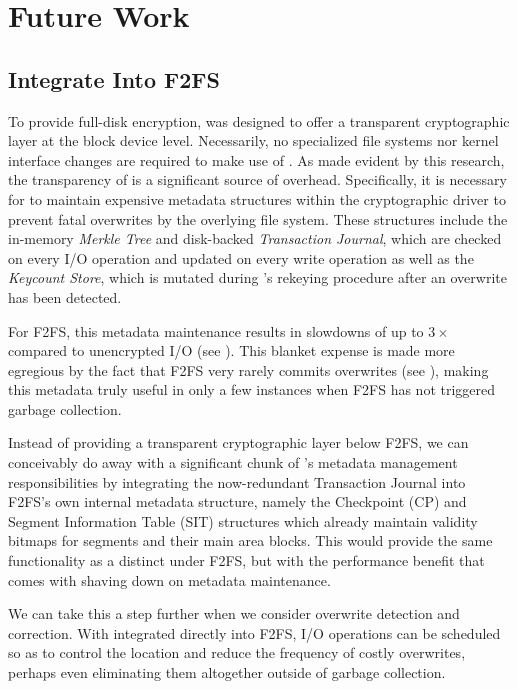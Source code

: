 \chapter{Future Work} \label{sec:future}

\section{Integrate \SYSTEM{} Into F2FS}

To provide full-disk encryption, \SYSTEM{} was designed to offer a transparent
cryptographic layer at the block device level. Necessarily, no specialized file
systems nor kernel interface changes are required to make use of \SYSTEM{}. As
made evident by this research, the transparency of \SYSTEM{} is a significant
source of overhead. Specifically, it is necessary for \SYSTEM{} to maintain
expensive metadata structures within the cryptographic driver to prevent fatal
overwrites by the overlying file system. These structures include the in-memory
\emph{Merkle Tree} and disk-backed \emph{Transaction Journal}, which are checked
on every I/O operation and updated on every write operation as well as the
\emph{Keycount Store}, which is mutated during \SYSTEM{}'s rekeying procedure
after an overwrite has been detected.

For F2FS, this metadata maintenance results in slowdowns of up to $3\times$
compared to unencrypted I/O (see ). This blanket expense
is made more egregious by the fact that F2FS very rarely commits overwrites (see
), making this metadata truly useful in only a few instances
when F2FS has not triggered garbage collection.

Instead of providing a transparent cryptographic layer below F2FS, we can
conceivably do away with a significant chunk of \SYSTEM{}'s metadata management
responsibilities by integrating the now-redundant Transaction Journal
into F2FS's own internal metadata structure, namely the Checkpoint (CP) and
Segment Information Table (SIT) structures which already maintain validity
bitmaps for segments and their main area blocks. This would provide the same
functionality as a distinct \SYSTEM{} under F2FS, but with the performance
benefit that comes with shaving down on metadata maintenance.

We can take this a step further when we consider overwrite detection and
correction. With \SYSTEM{} integrated directly into F2FS, I/O operations can be
scheduled so as to control the location and reduce the frequency of costly
overwrites, perhaps even eliminating them altogether outside of garbage
collection.

